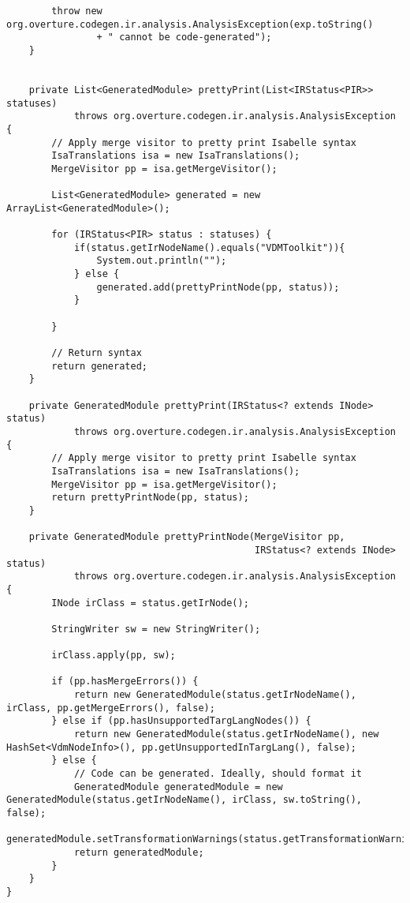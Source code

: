 \begin{appendices}
\begin{lstlisting}
        throw new org.overture.codegen.ir.analysis.AnalysisException(exp.toString()
                + " cannot be code-generated");
    }


    private List<GeneratedModule> prettyPrint(List<IRStatus<PIR>> statuses)
            throws org.overture.codegen.ir.analysis.AnalysisException {
        // Apply merge visitor to pretty print Isabelle syntax
        IsaTranslations isa = new IsaTranslations();
        MergeVisitor pp = isa.getMergeVisitor();

        List<GeneratedModule> generated = new ArrayList<GeneratedModule>();

        for (IRStatus<PIR> status : statuses) {
            if(status.getIrNodeName().equals("VDMToolkit")){
                System.out.println("");
            } else {
                generated.add(prettyPrintNode(pp, status));
            }

        }

        // Return syntax
        return generated;
    }

    private GeneratedModule prettyPrint(IRStatus<? extends INode> status)
            throws org.overture.codegen.ir.analysis.AnalysisException {
        // Apply merge visitor to pretty print Isabelle syntax
        IsaTranslations isa = new IsaTranslations();
        MergeVisitor pp = isa.getMergeVisitor();
        return prettyPrintNode(pp, status);
    }

    private GeneratedModule prettyPrintNode(MergeVisitor pp,
                                            IRStatus<? extends INode> status)
            throws org.overture.codegen.ir.analysis.AnalysisException {
        INode irClass = status.getIrNode();

        StringWriter sw = new StringWriter();

        irClass.apply(pp, sw);

        if (pp.hasMergeErrors()) {
            return new GeneratedModule(status.getIrNodeName(), irClass, pp.getMergeErrors(), false);
        } else if (pp.hasUnsupportedTargLangNodes()) {
            return new GeneratedModule(status.getIrNodeName(), new HashSet<VdmNodeInfo>(), pp.getUnsupportedInTargLang(), false);
        } else {
            // Code can be generated. Ideally, should format it
            GeneratedModule generatedModule = new GeneratedModule(status.getIrNodeName(), irClass, sw.toString(), false);
            generatedModule.setTransformationWarnings(status.getTransformationWarnings());
            return generatedModule;
        }
    }
}
\end{lstlisting}


\end{appendices}
